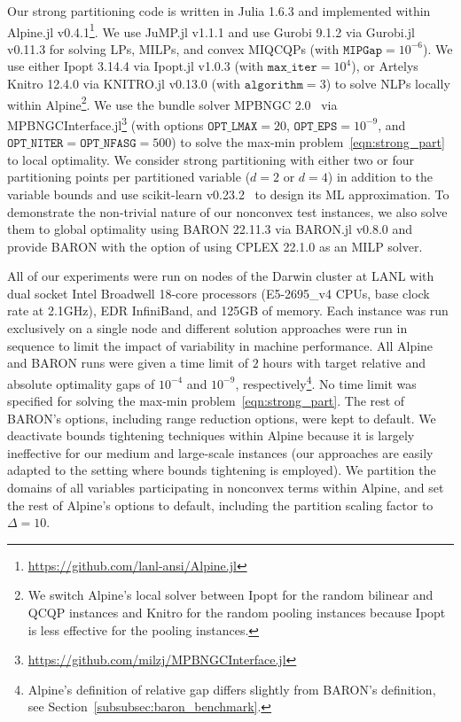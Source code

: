 \documentclass{article}
\newcommand{\pp}{partitioning points}
\begin{document}
Our strong partitioning code is written in Julia 1.6.3 and implemented within Alpine.jl v0.4.1\footnote{\url{https://github.com/lanl-ansi/Alpine.jl}}.
We use JuMP.jl v1.1.1 and use Gurobi 9.1.2 via Gurobi.jl v0.11.3 for solving LPs, MILPs, and convex MIQCQPs (with $\texttt{MIPGap} = 10^{-6}$). 
We use either Ipopt 3.14.4 via Ipopt.jl v1.0.3 (with $\texttt{max\_iter} = 10^4$), or Artelys Knitro 12.4.0 via KNITRO.jl v0.13.0 (with $\texttt{algorithm} = 3$) to solve NLPs locally within Alpine\footnote{We switch Alpine's local solver between Ipopt for the random bilinear and QCQP instances and Knitro for the random pooling instances because Ipopt is less effective for the pooling instances.}.
We use the bundle solver MPBNGC 2.0~\cite{makela2003multiobjective} via MPBNGCInterface.jl\footnote{\url{https://github.com/milzj/MPBNGCInterface.jl}} (with options $\texttt{OPT\_LMAX} = 20$, $\texttt{OPT\_EPS} = 10^{-9}$, and $\texttt{OPT\_NITER} = \texttt{OPT\_NFASG} = 500$) to solve the max-min problem~\eqref{eqn:strong_part} to local optimality.
We consider strong partitioning with either two or four {\pp} per partitioned variable ($d = 2$ or $d = 4$) in addition to the variable bounds and use scikit-learn v0.23.2~\cite{scikit-learn} to design its ML approximation.
To demonstrate the non-trivial nature of our nonconvex test instances, we also solve them  to global optimality using BARON 22.11.3 via BARON.jl v0.8.0 and provide BARON with the option of using CPLEX 22.1.0 as an MILP solver.


All of our experiments were run 
on nodes of the Darwin cluster at LANL with dual socket Intel Broadwell 18-core processors (E5-2695\_v4 CPUs, base clock rate at 2.1GHz), EDR InfiniBand, and 125GB of memory.
Each instance was run exclusively on a single node and different solution approaches were run in sequence to limit the impact of variability in machine performance.
All Alpine and BARON runs were given a time limit of $2$ hours with target relative and absolute optimality gaps of $10^{-4}$ and $10^{-9}$, respectively\footnote{Alpine's definition of relative gap differs slightly from BARON's definition, see Section~\ref{subsubsec:baron_benchmark}.}. 
No time limit was specified for solving the max-min problem~\eqref{eqn:strong_part}.
The rest of BARON's options, including range reduction options, were kept to default.
We deactivate bounds tightening techniques within Alpine because it is largely ineffective for our medium and large-scale instances (our approaches are easily adapted to the setting where bounds tightening is employed).
We partition the domains of all variables participating in nonconvex terms within Alpine, and set the rest of Alpine's options to default, including the partition scaling factor to $\Delta = 10$.
\end{document}
